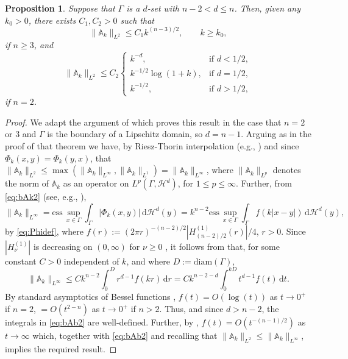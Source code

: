 \documentclass{birkjour}
\newtheorem{proposition}[theorem]{Proposition}
\theoremstyle{definition}
\theoremstyle{remark}
\numberwithin{equation}{section}
\newcommand{\cH}{\mathcal{H}}
\newcommand{\rd}{\mathrm{d}}
\newcommand{\bA}{\mathbb{A}}
\begin{document}
\begin{proposition} \label{prop:L2bound2} Suppose that $\Gamma$ is a $d$-set with $n-2<d\leq n$. Then, given any $k_0>0$, there exists $C_1,C_2>0$ such that
$$
\|\bA_k\|_{L^2} \leq C_1 k^{(n-3)/2}, \qquad k\geq k_0,
$$
if $n\geq 3$, and
$$
\|\bA_k\|_{L^2} \leq C_2 \left\{\begin{array}{ll} k^{-d}, & \mbox{if } d<1/2,\\  k^{-1/2}\log(1+k), & \mbox{if } d=1/2,\\ k^{-1/2}, & \mbox{if }d> 1/2,\end{array}\right.
$$
if $n=2$.
\end{proposition}
\begin{proof} We adapt the argument of \cite[Theorem 3.3]{ChGrLaLi:09} which proves this result in the case that $n=2$ or 3 and $\Gamma$ is the boundary of a Lipschitz domain, so $d=n-1$. Arguing as in the proof of that theorem we have, by Riesz-Thorin interpolation (e.g., \cite[Theorem 1.1.1]{Bergh:76}) and since $\Phi_k(x,y)=\Phi_k(y,x)$, that $\|\bA_k\|_{L^2} \leq \max(\|\bA_k\|_{L^\infty},\|\bA_k\|_{L^1}) = \|\bA_k\|_{L^\infty}$, where $\|\bA_k\|_{L^p}$ denotes the norm of $\bA_k$ as an operator on $L^p(\Gamma,\cH^d)$, for $1\leq p\leq \infty$. Further, from \eqref{eq:bAk2}  (see, e.g., \cite{Jorgens}),
$$
\|\bA_k\|_{L^\infty} = \mathrm{ess}\, \sup_{x\in \Gamma} \int_\Gamma|\Phi_k(x,y)| \, \rd \cH^d(y) = k^{n-2} \mathrm{ess}\,\sup_{x\in \Gamma} \int_\Gamma f(k|x-y|) \, \rd \cH^d(y),
$$
by \eqref{eq:Phidef}, where $f(r) := (2\pi r)^{-(n-2)/2}|H^{(1)}_{(n-2)/2}(r)|/4$, $r>0$. Since $|H^{(1)}_\nu|$ is decreasing on $(0,\infty)$ for $\nu\geq 0$ \cite[\S13.74]{Watson}, it follows from \cite[Lemma 2.1]{caetano2024} that, for some constant $C>0$ independent of $k$, and where $D:= \mathrm{diam}(\Gamma)$, 
\begin{equation} \label{eq:bAb2}
\|\bA_k\|_{L^\infty} \leq C k^{n-2} \int_0^D r^{d-1}f(kr)\, \rd r = C k^{n-2-d} \int_0^{kD} t^{d-1} f(t)\, \rd t.
\end{equation} 
By standard asymptotics of Bessel functions \cite[\S10.8]{NIST},  $f(t)=O(\log(t))$ as $t\to 0^+$ if $n=2$, $= O(t^{2-n})$ as $t\to 0^+$ if $n>2$. Thus, and since $d>n-2$, the integrals in \eqref{eq:bAb2}  are well-defined. Further, by \cite[\S10.17(i)]{NIST},  $f(t) = O(t^{-(n-1)/2})$ as $t\to \infty$ which, together with \eqref{eq:bAb2} and recalling that $\|\bA_k\|_{L^2}\leq \|\bA_k\|_{L^\infty}$, implies the required result.
\end{proof}
\end{document}
